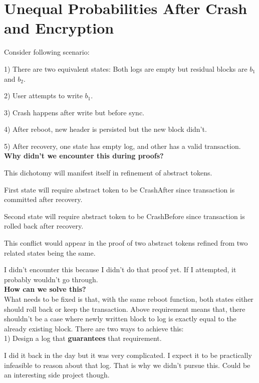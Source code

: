 \documentclass[onecolumn]{paper}
\begin{document}
		
		\section{Unequal Probabilities After Crash and Encryption}
		
		Consider following scenario:
		
		1) There are two equivalent states: Both logs are empty but residual blocks are $b_1$ and $b_2$.
		
		2) User attempts to write $b_1$.
		
		3) Crash happens after write but before sync.
		
		4) After reboot, new header is persisted but the new block didn't.
		
		5) After recovery, one state has empty log, and other has a valid transaction.\\
		
		{\bf Why didn't we encounter this during proofs?}
		
		This dichotomy will manifest itself in refinement of abstract tokens.
		
		First state will require abstract token to be CrashAfter since transaction is committed after recovery.
		
		Second state will require abstract token to be CrashBefore since transaction is rolled back after recovery.
		
		This conflict would appear in the proof of two abstract tokens refined from two related states being the same.
		
		I didn't encounter this because I didn't do that proof yet. If I attempted, it probably wouldn't go through.\\
		
		{\bf How can we solve this?}\\
		What needs to be fixed is that, with the same reboot function, both states either should roll back or keep the transaction.
		Above requirement means that, there shouldn't be a case where newly written block to log is exactly equal to the already existing block.
		There are two ways to achieve this:\\
		
		1) Design a log that {\bf guarantees} that requirement.
		
		I did it back in the day but it was very complicated. I expect it to be practically infeasible to reason about that log. That is why we didn't pursue this. 
		Could be an interesting side project though.\\
		
\end{document}
